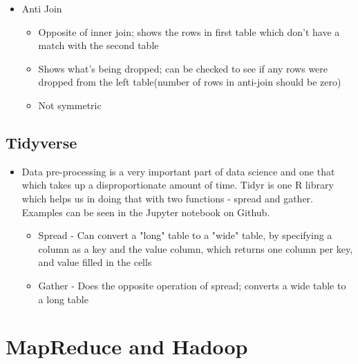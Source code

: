 \documentclass{article}
\begin{document}
\begin{itemize}
\begin{itemize}
        \end{itemize}
        \item Anti Join
        \begin{itemize}
            \item Opposite of inner join; shows the rows in first table which don't have a match with the second table
            \item Shows what's being dropped; can be checked to see if any rows were dropped from the left table(number of rows in anti-join should be zero)
            \item Not symmetric
        \end{itemize}
        \begin{itemize}
            
        \end{itemize}
\end{itemize}

\subsection{Tidyverse}
\begin{itemize}
    \item Data pre-processing is a very important part of data science and one that which takes up a disproportionate amount of time. Tidyr is one R library which helps us in doing that with two functions - spread and gather. Examples can be seen in the Jupyter notebook on Github.
    \begin{itemize}
        \item Spread - Can convert a "long" table to a "wide" table, by specifying a column as a key and the value column, which returns one column per key, and value filled in the cells
        \item Gather - Does the opposite operation of spread; converts a wide table to a long table
    \end{itemize}
\end{itemize}

\section{MapReduce and Hadoop}
\end{document}
